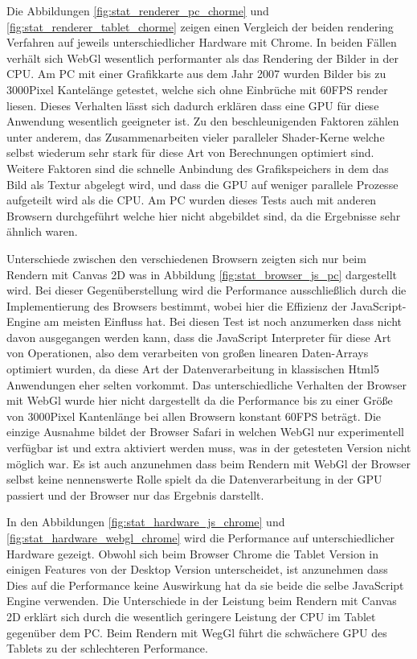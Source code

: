 Die Abbildungen \ref{fig:stat_renderer_pc_chorme} und \ref{fig:stat_renderer_tablet_chorme} zeigen einen Vergleich der beiden rendering Verfahren auf jeweils unterschiedlicher Hardware mit Chrome.
In beiden Fällen verhält sich WebGl wesentlich performanter als das Rendering der Bilder in der CPU.
Am PC mit einer Grafikkarte aus dem Jahr 2007 wurden Bilder bis zu 3000Pixel Kantelänge getestet, 
welche sich ohne Einbrüche mit 60FPS render liesen.
Dieses Verhalten lässt sich dadurch erklären dass eine GPU für diese Anwendung wesentlich geeigneter ist.
Zu den beschleunigenden Faktoren zählen unter anderem, das Zusammenarbeiten vieler paralleler Shader-Kerne welche selbst wiederum sehr stark für diese Art von Berechnungen optimiert sind.
Weitere Faktoren sind die schnelle Anbindung des Grafikspeichers in dem das Bild als Textur abgelegt wird, und dass die GPU auf weniger parallele Prozesse aufgeteilt wird als die CPU.
Am PC wurden dieses Tests auch mit anderen Browsern durchgeführt welche hier nicht abgebildet sind, da die Ergebnisse sehr ähnlich waren.

Unterschiede zwischen den verschiedenen Browsern zeigten sich nur beim Rendern mit Canvas 2D was in Abbildung \ref{fig:stat_browser_js_pc} dargestellt wird.
Bei dieser Gegenüberstellung wird die Performance ausschließlich durch die Implementierung des Browsers bestimmt,
wobei hier die Effizienz der JavaScript-Engine am meisten Einfluss hat.
Bei diesen Test ist noch anzumerken dass nicht davon ausgegangen werden kann, 
dass die JavaScript Interpreter für diese Art von Operationen, 
also dem verarbeiten von großen linearen Daten-Arrays optimiert wurden, 
da diese Art der Datenverarbeitung in klassischen Html5 Anwendungen eher selten vorkommt.
Das unterschiedliche Verhalten der Browser mit WebGl wurde hier nicht dargestellt da die Performance bis zu einer Größe von 3000Pixel Kantenlänge bei allen Browsern konstant 60FPS beträgt.
Die einzige Ausnahme bildet der Browser Safari in welchen WebGl nur experimentell verfügbar ist und extra aktiviert werden muss, was in der getesteten Version nicht möglich war.
Es ist auch anzunehmen dass beim Rendern mit WebGl der Browser selbst keine nennenswerte Rolle spielt da die Datenverarbeitung in der GPU passiert und der Browser nur das Ergebnis darstellt.

In den Abbildungen \ref{fig:stat_hardware_js_chrome} und \ref{fig:stat_hardware_webgl_chrome} wird die Performance auf unterschiedlicher Hardware gezeigt.
Obwohl sich beim Browser Chrome die Tablet Version in einigen Features von der Desktop Version unterscheidet, 
ist anzunehmen dass Dies auf die Performance keine Auswirkung hat da sie beide die selbe JavaScript Engine verwenden.
Die Unterschiede in der Leistung beim Rendern mit Canvas 2D erklärt sich durch die wesentlich geringere Leistung der CPU im Tablet gegenüber dem PC.
Beim Rendern mit WegGl führt die schwächere GPU des Tablets zu der schlechteren Performance.

